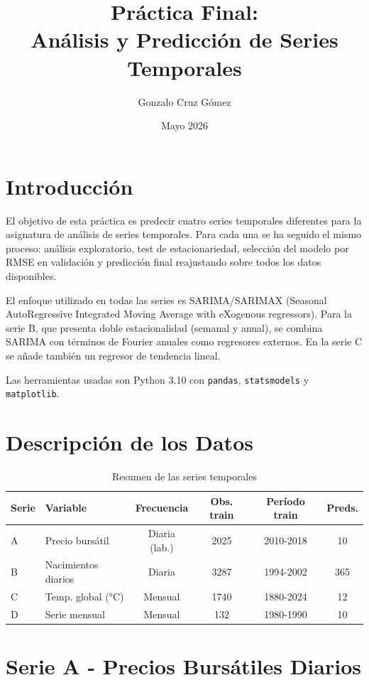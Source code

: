 \documentclass[12pt,a4paper]{article}
\title{\textbf{Práctica Final:\\Análisis y Predicción de Series Temporales}}
\author{Gonzalo Cruz Gómez}
\date{Mayo 2026}
\begin{document}
\maketitle
\section{Introducción}

El objetivo de esta práctica es predecir cuatro series temporales diferentes para la asignatura de análisis de series temporales. Para cada una se ha seguido el mismo proceso: análisis exploratorio, test de estacionariedad, selección del modelo por RMSE en validación y predicción final reajustando sobre todos los datos disponibles.

El enfoque utilizado en todas las series es SARIMA/SARIMAX (Seasonal AutoRegressive Integrated Moving Average with eXogenous regressors). Para la serie B, que presenta doble estacionalidad (semanal y anual), se combina SARIMA con términos de Fourier anuales como regresores externos. En la serie C se añade también un regresor de tendencia lineal.

Las herramientas usadas son Python 3.10 con \texttt{pandas}, \texttt{statsmodels} y \texttt{matplotlib}.

\section{Descripción de los Datos}

\begin{table}[H]
\centering
\caption{Resumen de las series temporales}
\begin{tabular}{llcccc}
\toprule
\textbf{Serie} & \textbf{Variable} & \textbf{Frecuencia} & \textbf{Obs. train} & \textbf{Período train} & \textbf{Preds.} \\
\midrule
A & Precio bursátil     & Diaria (lab.) & 2025 & 2010-2018 & 10 \\
B & Nacimientos diarios & Diaria        & 3287 & 1994-2002 & 365 \\
C & Temp. global (°C)   & Mensual       & 1740 & 1880-2024 & 12 \\
D & Serie mensual       & Mensual       & 132  & 1980-1990 & 10 \\
\bottomrule
\end{tabular}
\end{table}

\section{Serie A - Precios Bursátiles Diarios}
\end{document}
